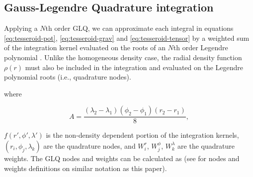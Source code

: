 \documentclass[extra, referee]{gji}
\begin{document}
\subsection{Gauss-Legendre Quadrature integration}

Applying a $N$th order GLQ, we can approximate each integral in equations
\ref{eq:tesseroid-pot}, \ref{eq:tesseroid-grav} and \ref{eq:tesseroid-tensor} by a
weighted sum of the integration kernel evaluated on the roots of an $N$th order Legendre
polynomial \citep[p.~390]{Hildebrand1987}.
Unlike the homogeneous density case, the radial density function $\rho(r)$ must also be
included in the integration and evaluated on the Legendre polynomial roots (i.e.,
quadrature nodes).


\noindent where

\begin{equation}
    A =
    \frac{(\lambda_2 - \lambda_1)(\phi_2 - \phi_1)(r_2 - r_1)}{8},
\end{equation}

\noindent $f(r', \phi', \lambda')$ is the non-density dependent portion of the
integration kernels, $(r_i, \phi_j, \lambda_k)$ are the quadrature nodes, and
$W_i^r$, $W_j^\phi$, $W_k^\lambda$ are the quadrature weights.
The GLQ nodes and weights can be calculated as \citet[p.~391]{Hildebrand1987} (see
\citet{Uieda2016} for nodes and weights definitions on similar notation as this paper).
\end{document}
